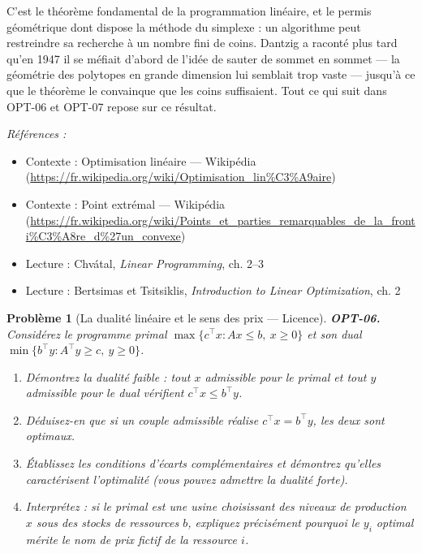 \documentclass[11pt]{article}
\newtheorem{problem}{Problème}
\newenvironment{refs}{\par\small\noindent\emph{Références :}\begin{itemize}\setlength\itemsep{0pt}}{\end{itemize}\normalsize}
\begin{document}
\noindent C'est le théorème fondamental de la programmation linéaire, et le permis géométrique dont dispose la méthode du simplexe : un algorithme peut restreindre sa recherche à un nombre fini de coins. Dantzig a raconté plus tard qu'en 1947 il se méfiait d'abord de l'idée de sauter de sommet en sommet --- la géométrie des polytopes en grande dimension lui semblait trop vaste --- jusqu'à ce que le théorème le convainque que les coins suffisaient. Tout ce qui suit dans OPT-06 et OPT-07 repose sur ce résultat.

\begin{refs}
\item Contexte : Optimisation linéaire --- Wikipédia (\url{https://fr.wikipedia.org/wiki/Optimisation_lin%C3%A9aire})
\item Contexte : Point extrémal --- Wikipédia (\url{https://fr.wikipedia.org/wiki/Points_et_parties_remarquables_de_la_fronti%C3%A8re_d%27un_convexe})
\item Lecture : Chvátal, \textit{Linear Programming}, ch. 2--3
\item Lecture : Bertsimas et Tsitsiklis, \textit{Introduction to Linear Optimization}, ch. 2
\end{refs}

\bigskip

\begin{problem}[{La dualité linéaire et le sens des prix --- Licence}]
\textbf{OPT-06.} Considérez le programme primal $\max\{c^\top x : Ax \le b,\ x \ge 0\}$ et son dual $\min\{b^\top y : A^\top y \ge c,\ y \ge 0\}$.
\begin{enumerate}
\item[(a)] Démontrez la dualité faible : tout $x$ admissible pour le primal et tout $y$ admissible pour le dual vérifient $c^\top x \le b^\top y$.
\item[(b)] Déduisez-en que si un couple admissible réalise $c^\top x = b^\top y$, les deux sont optimaux.
\item[(c)] Établissez les conditions d'écarts complémentaires et démontrez qu'elles caractérisent l'optimalité (vous pouvez admettre la dualité forte).
\item[(d)] Interprétez : si le primal est une usine choisissant des niveaux de production $x$ sous des stocks de ressources $b$, expliquez précisément pourquoi le $y_i$ optimal mérite le nom de \textit{prix fictif} de la ressource $i$.
\end{enumerate}

\end{problem}
\end{document}
